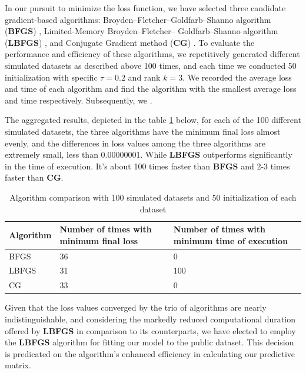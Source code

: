 \documentclass{article}
\begin{document}
In our pursuit to minimize the loss function, we have selected three candidate gradient-based algorithms: Broyden–Fletcher–Goldfarb–Shanno algorithm (\textbf{BFGS}) \cite{35d0019d-775a-3628-b0b4-67be112e346b}, Limited-Memory Broyden–Fletcher– Goldfarb–Shanno algorithm (\textbf{LBFGS}) \cite{liu1989limited}, and Conjugate Gradient method (\textbf{CG}) \cite{hestenes1952methods}. To evaluate the performance and efficiency of these algorithms, we repetitively generated different simulated datasets as described above 100 times, and each time we conducted 50 initialization with specific $\tau = 0.2$ and rank $k = 3$. We recorded the average loss and time of each algorithm and find the algorithm with the smallest average loss and time respectively. Subsequently, we .

The aggregated results, depicted in the table \ref{tab:algorithm_simulation} below, for each of the 100 different simulated datasets, the three algorithms have the minimum final loss almost evenly, and the differences in loss values among the three algorithms are extremely small, less than 0.00000001. While \textbf{LBFGS} outperforms significantly in the time of execution. It's about 100 times faster than \textbf{BFGS} and 2-3 times faster than \textbf{CG}.

\begin{table}[H]
    \centering
    \begin{tabular}{|p{2cm}|p{4.5cm}|p{4.5cm}|}
    \hline
     \textbf{Algorithm}    & Number of times with minimum final loss & Number of times with minimum time of execution \\
     \hline
     BFGS    & 36 & 0\\
     \hline
     LBFGS & 31 & 100\\
     \hline
     CG & 33 & 0\\
     \hline
    \end{tabular}
    \caption{Algorithm comparison with 100 simulated datasets and 50 initialization of each dataset}
    \label{tab:algorithm_simulation}
\end{table}

Given that the loss values converged by the trio of algorithms are nearly indistinguishable, and considering the markedly reduced computational duration offered by \textbf{LBFGS} in comparison to its counterparts, we have elected to employ the \textbf{LBFGS} algorithm for fitting our model to the public dataset. This decision is predicated on the algorithm's enhanced efficiency in calculating our predictive matrix.
\end{document}

